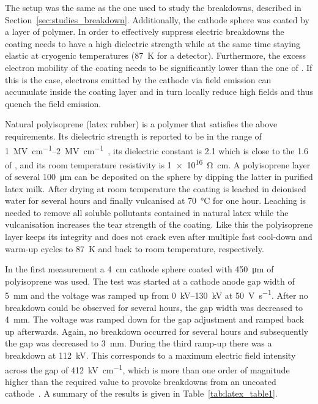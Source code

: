 The setup was the same as the one used to study the breakdowns, described in Section~\ref{sec:studies_breakdown}.
Additionally, the cathode sphere was coated by a layer of polymer.
In order to effectively suppress electric breakdowns the coating needs to have a high dielectric strength while at the same time staying elastic at cryogenic temperatures (\SI{87}{\kelvin} for a \lar{} detector).
Furthermore, the excess electron mobility of the coating needs to be significantly lower than the one of \lar{}.
If this is the case, electrons emitted by the cathode via field emission can accumulate inside the coating layer and in turn locally reduce high fields and thus quench the field emission.

Natural polyisoprene (latex rubber) is a polymer that satisfies the above requirements.
Its dielectric strength is reported to be in the range of \SIrange{1}{2}{\mega\volt\per\centi\metre}~\cite{fizikaDielektrikov}, its dielectric constant is \num{2.1} which is close to the \num{1.6} of \lar{}, and its room temperature resistivity is \SI{1e16}{\ohm\centi\metre}.
A polyisoprene layer of several \SI{100}{\micro\metre} can be deposited on the sphere by dipping the latter in purified latex milk.
After drying at room temperature the coating is leached in deionised water for several hours and finally vulcanised at \SI{70}{\celsius} for one hour.
Leaching is needed to remove all soluble pollutants contained in natural latex while the vulcanisation increases the tear strength of the coating.
Like this the polyisoprene layer keeps its integrity and does not crack even after multiple fast cool-down and warm-up cycles to \SI{87}{\kelvin} and back to room temperature, respectively.

In the first measurement a \SI{4}{\centi\metre} cathode sphere coated with \SI{450}{\micro\metre} of polyisoprene was used.
The test was started at a cathode anode gap width of \SI{5}{\milli\metre} and the voltage was ramped up from \SIrange{0}{130}{\kilo\volt} at \SI{50}{\volt\per\second}.
After no breakdown could be observed for several hours, the gap width was decreased to \SI{4}{\milli\metre}.
The voltage was ramped down for the gap adjustment and ramped back up afterwards.
Again, no breakdown occurred for several hours and subsequently the gap was decreased to \SI{3}{\milli\metre}.
During the third ramp-up there was a breakdown at \SI{112}{\kilo\volt}.
This corresponds to a maximum electric field intensity across the gap of \SI{412}{\kilo\volt\per\centi\metre}, which is more than one order of magnitude higher than the required value to provoke breakdowns from an uncoated cathode~\cite{breakdown_14, breakdown_16}.
A summary of the results is given in Table~\ref{tab:latex_table1}.

